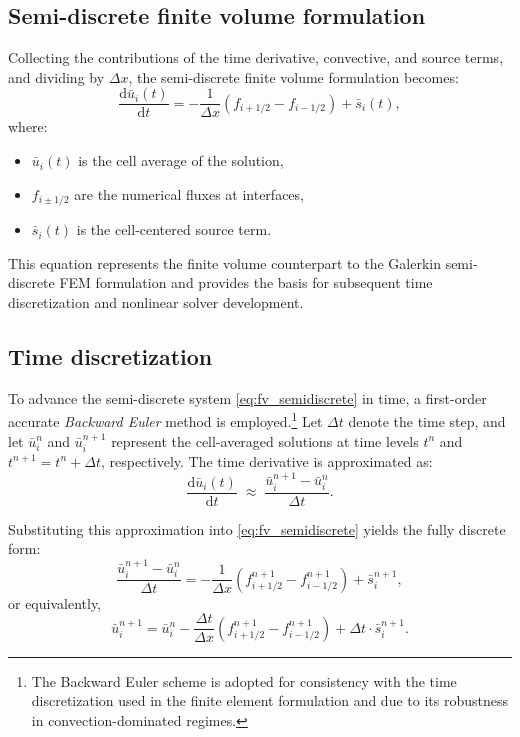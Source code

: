 \subsection{Semi-discrete finite volume formulation}

Collecting the contributions of the time derivative, convective, and source terms, and dividing by \( \Delta x \), the semi-discrete finite volume formulation becomes:
\begin{equation}
\frac{\mathrm{d} \bar{u}_i(t)}{\mathrm{d}t}
= - \frac{1}{\Delta x} \left( f_{i+1/2} - f_{i-1/2} \right) + \bar{s}_i(t),
\label{eq:fv_semidiscrete}
\end{equation}
where:
\begin{itemize}
    \item \( \bar{u}_i(t) \) is the cell average of the solution,
    \item \( f_{i\pm1/2} \) are the numerical fluxes at interfaces,
    \item \( \bar{s}_i(t) \) is the cell-centered source term.
\end{itemize}

This equation represents the finite volume counterpart to the Galerkin semi-discrete FEM formulation and provides the basis for subsequent time discretization and nonlinear solver development.


\subsection{Time discretization}

To advance the semi-discrete system \eqref{eq:fv_semidiscrete} in time, a first-order accurate \textit{Backward Euler} method is employed.\footnote{The Backward Euler scheme is adopted for consistency with the time discretization used in the finite element formulation and due to its robustness in convection-dominated regimes.} Let \( \Delta t \) denote the time step, and let \( \bar{u}_i^n \) and \( \bar{u}_i^{n+1} \) represent the cell-averaged solutions at time levels \( t^n \) and \( t^{n+1} = t^n + \Delta t \), respectively. The time derivative is approximated as:
\begin{equation}
\frac{\mathrm{d} \bar{u}_i(t)}{\mathrm{d}t} 
\;\approx\;
\frac{\bar{u}_i^{n+1} - \bar{u}_i^n}{\Delta t}.
\end{equation}

Substituting this approximation into \eqref{eq:fv_semidiscrete} yields the fully discrete form:
\begin{equation}
\frac{\bar{u}_i^{n+1} - \bar{u}_i^n}{\Delta t}
= - \frac{1}{\Delta x} \left( f_{i+1/2}^{n+1} - f_{i-1/2}^{n+1} \right) + \bar{s}_i^{n+1},
\label{eq:fv_fully_discrete}
\end{equation}
or equivalently,
\begin{equation}
\bar{u}_i^{n+1} = \bar{u}_i^n - \frac{\Delta t}{\Delta x} \left( f_{i+1/2}^{n+1} - f_{i-1/2}^{n+1} \right) + \Delta t \cdot \bar{s}_i^{n+1}.
\end{equation}


